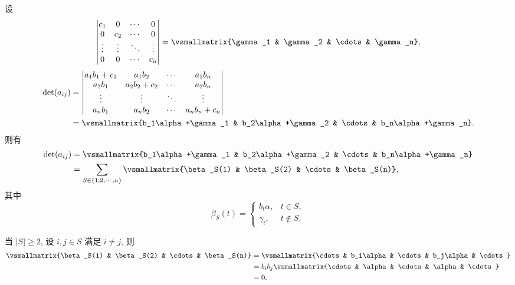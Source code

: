 \begin{solution}
    设
    \[    
    \begin{vmatrix}
        c_1 & 0 & \cdots & 0\\
        0 & c_2 & \cdots & 0\\
        \vdots & \vdots & \ddots & \vdots\\
        0 & 0 & \cdots & c_n
    \end{vmatrix}
    =\vsmallmatrix{\gamma_1 & \gamma_2 & \cdots & \gamma_n},
    \]
    \begin{align*}
        \det(a_{ij})&=
        \begin{vmatrix}
            a_1b_1+c_1 & a_1b_2 & \cdots & a_1b_n\\
            a_2b_1 & a_2b_2+c_2 & \cdots & a_2b_n\\
            \vdots & \vdots & \ddots & \vdots\\
            a_nb_1 & a_nb_2 & \cdots & a_nb_n+c_n
        \end{vmatrix}\\
        &=\vsmallmatrix{b_1\alpha+\gamma_1 & b_2\alpha+\gamma_2 & \cdots & b_n\alpha+\gamma_n}.
    \end{align*}
    则有
    \begin{align*}
        \det(a_{ij})
        &=\vsmallmatrix{b_1\alpha+\gamma_1 & b_2\alpha+\gamma_2 & \cdots & b_n\alpha+\gamma_n}\\
        &=\sum_{S\in\{1,2,\cdots,n\}}\vsmallmatrix{\beta_S(1) & \beta_S(2) & \cdots & \beta_S(n)},
    \end{align*}
    其中
    \[
    \beta_S(t)=
    \begin{cases}
    b_t\alpha,& t\in S,\\
    \gamma_t,& t\notin S.
    \end{cases}
    \]

    当 \(|S|\geq2\), 设 \(i,j\in S\) 满足 \(i\neq j\), 则
    \begin{align*}
        \vsmallmatrix{\beta_S(1) & \beta_S(2) & \cdots & \beta_S(n)}
        &=\vsmallmatrix{\cdots & b_i\alpha & \cdots & b_j\alpha & \cdots}\\
        &=b_ib_j\vsmallmatrix{\cdots & \alpha & \cdots & \alpha & \cdots}\\
        &=0.
    \end{align*}


\end{solution}
